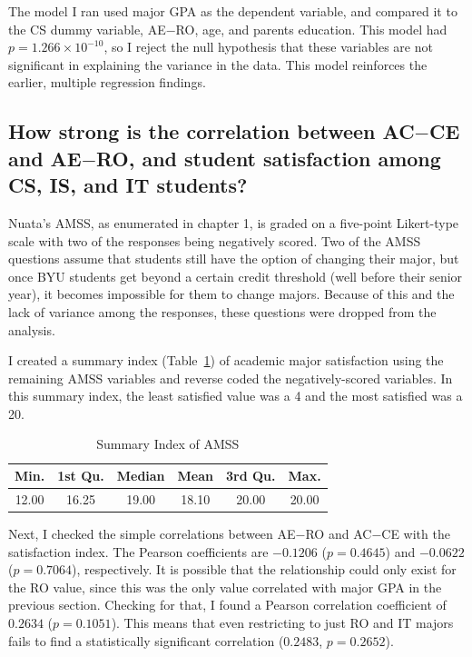 The model I ran used major GPA as the dependent variable, and compared it to the CS dummy variable, AE$-$RO, age, and parents education. This model had $p=1.266\times 10^{-10}$, so I reject the null hypothesis that these variables are not significant in explaining the variance in the data. This model reinforces the earlier, multiple regression findings.

\subsection{How strong is the correlation between AC$-$CE and AE$-$RO, and student satisfaction among CS, IS, and IT students?}
Nuata's AMSS, as enumerated in chapter 1, is graded on a five-point Likert-type scale with two of the responses being negatively scored. Two of the AMSS questions assume that students still have the option of changing their major, but once BYU students get beyond a certain credit threshold (well before their senior year), it becomes impossible for them to change majors. Because of this and the lack of variance among the responses, these questions were dropped from the analysis.

I created a summary index (Table~\ref{tab:nuata-summary-index}) of academic major satisfaction using the remaining AMSS variables and reverse coded the negatively-scored variables. In this summary index, the least satisfied value was a 4 and the most satisfied was a 20.

\begin{table}[!htb]
  \centering
  \caption{Summary Index of AMSS}
  \label{tab:nuata-summary-index}
  \begin{tabular}{cccccc}
    \toprule
    Min.  & 1st Qu. & Median & Mean  & 3rd Qu. &Max. \\
    \midrule
    12.00 &  16.25  & 19.00  & 18.10 & 20.00   & 20.00 \\
    \bottomrule
  \end{tabular}
\end{table}

Next, I checked the simple correlations between AE$-$RO and AC$-$CE with the satisfaction index. The Pearson coefficients are $-0.1206$ ($p=0.4645$) and $-0.0622$ ($p=0.7064$), respectively. It is possible that the relationship could only exist for the RO value, since this was the only value correlated with major GPA in the previous section. Checking for that, I found a Pearson correlation coefficient of $0.2634$ ($p=0.1051$). This means that even restricting to just RO and IT majors fails to find a statistically significant correlation ($0.2483$, $p=0.2652$).

